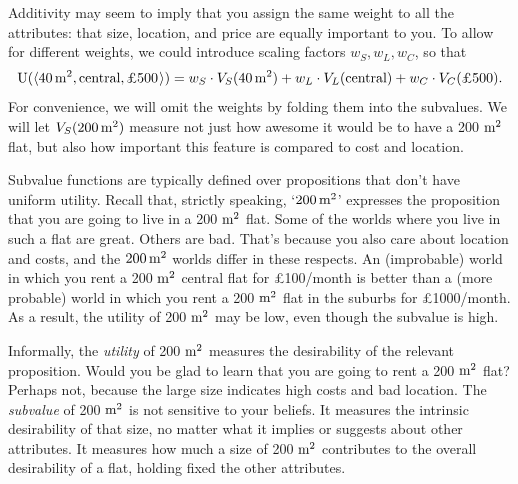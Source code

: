 Additivity may seem to imply that you assign the same weight to all the
attributes: that size, location, and price are equally important to you. To
allow for different weights, we could introduce scaling factors $w_S, w_L, w_C$,
so that
\[
\U(\t{40\, \m^2, \text{central}, \text{£500}}) = w_S \cdot V_{S}(40\, \m^2) +
w_L \cdot V_{L}(\text{central}) + w_C \cdot V_{C}(\text{£500}).
\]
For convenience, we will omit the weights by folding them into the subvalues. We
will let $V_S(200\, \text{m}^2)$ measure not just how awesome it would be to have a 200
$\text{m}^2$ flat, but also how important this feature is compared to cost and
location.

Subvalue functions are typically defined over propositions that don't have
uniform utility. Recall that, strictly speaking, `$200\, \text{m}^{2}$' expresses the
proposition that you are going to live in a 200 $\text{m}^{2}$ flat. Some of the worlds
where you live in such a flat are great. Others are bad. That's because you also
care about location and costs, and the $200\, \text{m}^{2}$ worlds differ in these respects. An
(improbable) world in which you rent a 200 $\text{m}^{2}$ central flat for £100/month
is better than a (more probable) world in which you rent a 200 $\text{m}^{2}$ flat in
the suburbs for £1000/month. As a result, the utility of 200 $\text{m}^2$ may
be low, even though the subvalue is high.

Informally, the \emph{utility} of 200 $\text{m}^{2}$ measures the desirability of the relevant
proposition. Would you be glad to learn that you are going to rent a 200 $\text{m}^{2}$
flat? Perhaps not, because the large size indicates high costs and bad location.
The \emph{subvalue} of 200 $\text{m}^{2}$ is not sensitive to your beliefs. It measures the
intrinsic desirability of that size, no matter what it implies or
suggests about other attributes. It measures how much a size of 200 $\text{m}^{2}$
contributes to the overall desirability of a flat, holding fixed the other
attributes.


